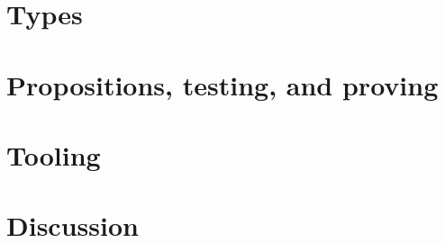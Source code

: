 \documentclass[submission,copyright,creativecommons]{eptcs}
\begin{document}
\section{Types}
\label{sec:types}

\section{Propositions, testing, and proving}
\label{sec:props}

\section{Tooling}
\label{sec:tools}

\section{Discussion}
\label{sec:discussion}

\cite{Yorgey:2012:promotion}

\end{document}
